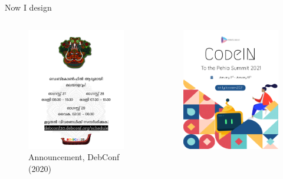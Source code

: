 \documentclass[presentation]{beamer}
\begin{document}
\begin{frame}[label={sec:org54778ac}]{Now I design}
\begin{columns}
\begin{column}{0.25\columnwidth}
\begin{figure}[htbp]
\includegraphics[width=.9\linewidth]{./images/theyyam.png}
\caption{Announcement, DebConf (2020)}
\end{figure}
\end{column}
\begin{column}{0.25\columnwidth}
\begin{figure}[htbp]
\centering
\includegraphics[width=.9\linewidth]{./images/codein.png}

\end{figure}
\end{column}
\end{columns}
\end{frame}
\end{document}
